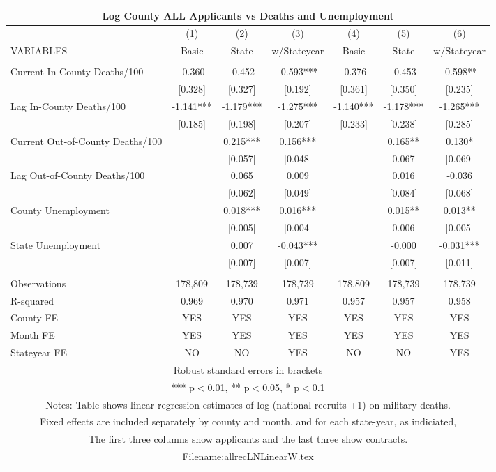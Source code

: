 \documentclass[]{article}
\begin{document}
\begin{tabular}{lcccccc}
\multicolumn{7}{c}{Log County ALL Applicants vs Deaths and Unemployment} \\ \hline
 & (1) & (2) & (3) & (4) & (5) & (6) \\
VARIABLES & Basic & State & w/Stateyear & Basic & State & w/Stateyear \\ \hline
 &  &  &  &  &  &  \\
Current In-County Deaths/100 & -0.360 & -0.452 & -0.593*** & -0.376 & -0.453 & -0.598** \\
 & [0.328] & [0.327] & [0.192] & [0.361] & [0.350] & [0.235] \\
Lag In-County Deaths/100 & -1.141*** & -1.179*** & -1.275*** & -1.140*** & -1.178*** & -1.265*** \\
 & [0.185] & [0.198] & [0.207] & [0.233] & [0.238] & [0.285] \\
Current Out-of-County Deaths/100 &  & 0.215*** & 0.156*** &  & 0.165** & 0.130* \\
 &  & [0.057] & [0.048] &  & [0.067] & [0.069] \\
Lag Out-of-County Deaths/100 &  & 0.065 & 0.009 &  & 0.016 & -0.036 \\
 &  & [0.062] & [0.049] &  & [0.084] & [0.068] \\
County Unemployment &  & 0.018*** & 0.016*** &  & 0.015** & 0.013** \\
 &  & [0.005] & [0.004] &  & [0.006] & [0.005] \\
State Unemployment &  & 0.007 & -0.043*** &  & -0.000 & -0.031*** \\
 &  & [0.007] & [0.007] &  & [0.007] & [0.011] \\
 &  &  &  &  &  &  \\
Observations & 178,809 & 178,739 & 178,739 & 178,809 & 178,739 & 178,739 \\
R-squared & 0.969 & 0.970 & 0.971 & 0.957 & 0.957 & 0.958 \\
County FE & YES & YES & YES & YES & YES & YES \\
Month FE & YES & YES & YES & YES & YES & YES \\
 Stateyear FE & NO & NO & YES & NO & NO & YES \\ \hline
\multicolumn{7}{c}{ Robust standard errors in brackets} \\
\multicolumn{7}{c}{ *** p$<$0.01, ** p$<$0.05, * p$<$0.1} \\
\multicolumn{7}{c}{ Notes: Table shows linear regression estimates of log (national recruits +1) on military deaths.} \\
\multicolumn{7}{c}{ Fixed effects are included separately by county and month, and for each state-year, as indiciated,} \\
\multicolumn{7}{c}{ The first three columns show applicants and the last three show contracts.} \\
\multicolumn{7}{c}{ Filename:allrecLNLinearW.tex} \\
\end{tabular}
\end{document}
